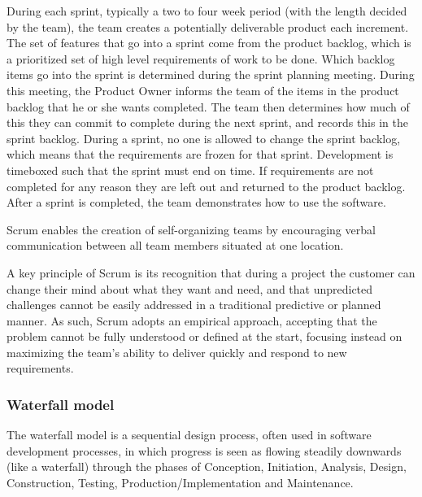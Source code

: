 During each sprint, typically a two to four week period (with the length decided by the team),
the team creates a potentially deliverable product each increment.
The set of features that go into a sprint come from the product backlog,
which is a prioritized set of high level requirements of work to be done.
Which backlog items go into the sprint is determined during the sprint planning meeting.
During this meeting, the Product Owner informs the team of the items in the product backlog that he
or she wants completed.
The team then determines how much of this they can commit to complete during the next sprint,
and records this in the sprint backlog.
During a sprint, no one is allowed to change the sprint backlog, which means that the requirements
are frozen for that sprint. Development is timeboxed such that the sprint must end on time.
If requirements are not completed for any reason they are left out and returned to the product backlog.
After a sprint is completed, the team demonstrates how to use the software.

Scrum enables the creation of self-organizing teams by encouraging verbal communication between all team members situated at one location.

A key principle of Scrum is its recognition that during a project the customer can change their
mind about what they want and need, and that unpredicted challenges cannot be easily addressed
in a traditional predictive or planned manner.
As such, Scrum adopts an empirical approach, accepting that the problem cannot be fully understood
or defined at the start, focusing instead on maximizing the team’s ability to deliver quickly and
respond to new requirements.

\subsubsection{Waterfall model}
The waterfall model is a sequential design process, often used in software development processes,
in which progress is seen as flowing steadily downwards (like a waterfall) through the phases of
Conception, Initiation, Analysis, Design, Construction, Testing, Production/Implementation and Maintenance.

